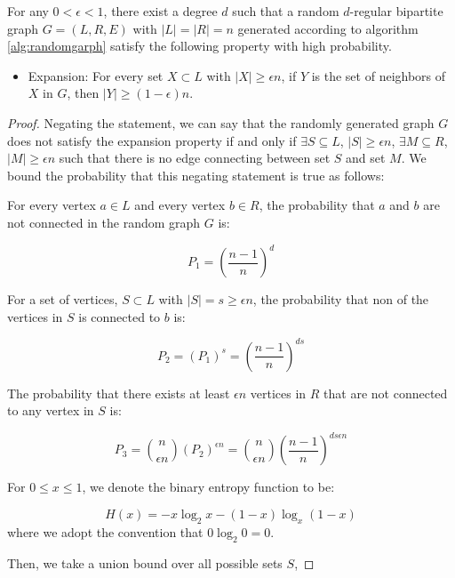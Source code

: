 \begin{lemma}
\label{lemma:randomgraph}

For any $0 < \epsilon < 1$, there exist a degree $d$ such that a random $d$-regular bipartite graph $G=(L, R, E)$ with $|L| = |R| = n$ generated according to algorithm \ref{alg:randomgarph} satisfy the following property with high probability.

    \begin{itemize}
        \item Expansion: For every set $X \subset L$ with $|X| \ge \epsilon n$, if $Y$ is the set of neighbors of $X$ in $G$, then $|Y| \ge (1 - \epsilon)  n$.
    \end{itemize}

\end{lemma}

\begin{proof}

Negating the statement, we can say that the randomly generated graph $G$ does not satisfy the expansion property if and only if $\exists S \subseteq L$, $|S| \ge \epsilon n$, $\exists M \subseteq R$, $|M| \ge  \epsilon n$ such that there is no edge connecting between set $S$ and set $M$. We bound the probability that this negating statement is true as follows:

For every vertex $a \in L$ and every vertex $b \in R$, the probability that $a$ and $b$ are not connected in the random graph $G$ is:

$$P_1 = (\frac{n-1}{n})^{d}$$

For a set of vertices, $S \subset L$ with $|S| = s \ge \epsilon n$, the probability that non of the vertices in $S$ is connected to $b$ is:

$$P_2 = (P_1)^s = (\frac{n-1}{n})^{d s}$$

The probability that there exists at least $\epsilon n$ vertices in $R$ that are not connected to any vertex in $S$ is:

$$P_3 = \binom{n}{\epsilon n} (P_2)^{\epsilon n} = \binom{n}{\epsilon n} (\frac{n-1}{n})^{d s \epsilon n}$$

For $0 \le x \le 1$, we denote the binary entropy function to be:

$$H(x) = -x\log_2 x - (1-x)\log_x (1-x)$$ 
where we adopt the convention that $0 \log_2 0 = 0$.

Then, we take a union bound over all possible sets $S$, 


\end{proof}
